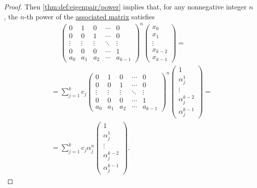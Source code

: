 \begin{proof}
  Then \cref{thm:def:eigenpair/power} implies that, for any nonnegative integer \( n \), the \( n \)-th power of the \hyperref[def:homogeneous_linear_recurrence_matrix]{associated matrix} satisfies
  \begin{align*}
    &\phantom{{}={}}
    \begin{pmatrix}
      0      & 1      & 0      & \cdots & 0      \\
      0      & 0      & 1      & \cdots & 0      \\
      \vdots & \vdots & \vdots & \ddots & \vdots \\
      0      & 0      & 0      & \cdots & 1      \\
      a_0    & a_1    & a_2    & \cdots & a_{k-1}
    \end{pmatrix}^n
    \begin{pmatrix}
      x_0     \\
      x_1     \\
      \vdots  \\
      x_{k-2} \\
      x_{k-1}
    \end{pmatrix}
    = \\ &=
    \sum_{j=1}^k c_j
    \begin{pmatrix}
      0      & 1      & 0      & \cdots & 0      \\
      0      & 0      & 1      & \cdots & 0      \\
      \vdots & \vdots & \vdots & \ddots & \vdots \\
      0      & 0      & 0      & \cdots & 1      \\
      a_0    & a_1    & a_2    & \cdots & a_{k-1}
    \end{pmatrix}^n
    \begin{pmatrix}
      1              \\
      \alpha_j^1     \\
      \vdots         \\
      \alpha_j^{k-2} \\
      \alpha_j^{k-1}
    \end{pmatrix}
    = \\ &=
    \sum_{j=1}^k c_j \alpha_j^n
    \begin{pmatrix}
      1              \\
      \alpha_j^1     \\
      \vdots         \\
      \alpha_j^{k-2} \\
      \alpha_j^{k-1}
    \end{pmatrix}.
  \end{align*}


\end{proof}
